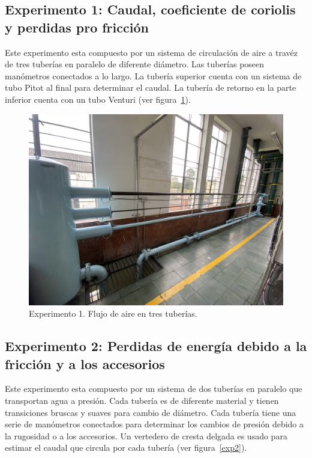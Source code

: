 \documentclass[10pt, a4paper]{exam}
\begin{document}
\subsection{Experimento 1: Caudal, coeficiente de coriolis y perdidas pro fricci\'on}
Este experimento esta compuesto por un sistema de circulaci\'on de aire a trav\'ez de tres tuber\'ias en paralelo de diferente di\'ametro. Las tuber\'ias poseen man\'ometros conectados a lo largo. La tuber\'ia superior cuenta con un sistema de  tubo Pitot al final para determinar el caudal. La tuber\'ia de retorno en la parte inferior cuenta con un tubo Venturi (ver figura~\ref{exp1}). 
\begin{figure}[h]
    \centering
    \includegraphics[width=\textwidth]{exp1.jpg}
    \caption{Experimento 1. Flujo de aire en tres tuber\'ias.}
    \label{exp1}
\end{figure}

\subsection{Experimento 2: Perdidas de energ\'ia debido a la fricci\'on y a los accesorios}  
Este experimento esta compuesto por un sistema de dos tuber\'ias en paralelo que transportan agua a presi\'on. Cada tuber\'ia es de diferente material y tienen transiciones bruscas y suaves para cambio de di\'ametro. Cada tuber\'ia tiene una serie de man\'ometros conectados para determinar los cambios de presi\'on debido a la rugosidad o a los accesorios. Un vertedero de cresta delgada es usado para estimar el caudal que circula por cada tuber\'ia (ver figura~\ref{exp2}). 
\end{document}
